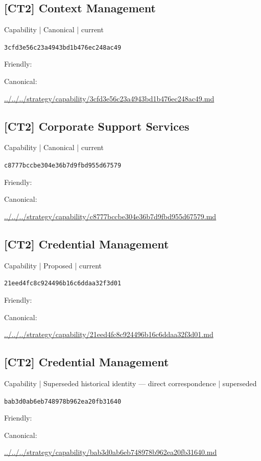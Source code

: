 \documentclass[10pt,a4paper]{article}
\begin{document}
\subsection*{[CT2] Context Management}
{\small Capability | Canonical | current}\par
\texttt{3cfd3e56c23a4943bd1b476ec248ac49}\par
Friendly: \par
Canonical: \par
{\footnotesize\url{../../../strategy/capability/3cfd3e56c23a4943bd1b476ec248ac49.md}}\par
\subsection*{[CT2] Corporate Support Services}
{\small Capability | Canonical | current}\par
\texttt{c8777bccbe304e36b7d9fbd955d67579}\par
Friendly: \par
Canonical: \par
{\footnotesize\url{../../../strategy/capability/c8777bccbe304e36b7d9fbd955d67579.md}}\par
\subsection*{[CT2] Credential Management}
{\small Capability | Proposed | current}\par
\texttt{21eed4fc8c924496b16c6ddaa32f3d01}\par
Friendly: \par
Canonical: \par
{\footnotesize\url{../../../strategy/capability/21eed4fc8c924496b16c6ddaa32f3d01.md}}\par
\subsection*{[CT2] Credential Management}
{\small Capability | Superseded historical identity — direct correspondence | superseded}\par
\texttt{bab3d0ab6eb748978b962ea20fb31640}\par
Friendly: \par
Canonical: \par
{\footnotesize\url{../../../strategy/capability/bab3d0ab6eb748978b962ea20fb31640.md}}\par
\end{document}
